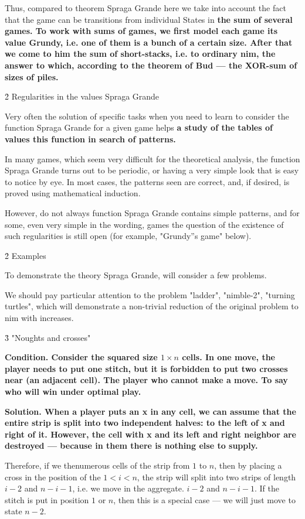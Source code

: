 Thus, compared to theorem Spraga Grande here we take into account the fact that the game can be transitions from individual States in \bf{the sum of several games}. To work with sums of games, we first model each game its value Grundy, i.e. one of them is a bunch of a certain size. After that we come to him the sum of short-stacks, i.e. to ordinary nim, the answer to which, according to the theorem of Bud --- the XOR-sum of sizes of piles.


\h2{ Regularities in the values Spraga Grande }

Very often the solution of specific tasks when you need to learn to consider the function Spraga Grande for a given game helps \bf{a study of the tables of values} this function in search of patterns.

In many games, which seem very difficult for the theoretical analysis, the function Spraga Grande turns out to be periodic, or having a very simple look that is easy to notice by eye. In most cases, the patterns seen are correct, and, if desired, is proved using mathematical induction.

However, do not always function Spraga Grande contains simple patterns, and for some, even very simple in the wording, games the question of the existence of such regularities is still open (for example, "Grundy''s game" below).


\h2{ Examples }

To demonstrate the theory Spraga Grande, will consider a few problems.

We should pay particular attention to the problem "ladder", "nimble-2", "turning turtles", which will demonstrate a non-trivial reduction of the original problem to nim with increases.


\h3{ "Noughts and crosses" }

\bf{Condition}. Consider the squared size $1 \times n$ cells. In one move, the player needs to put one stitch, but it is forbidden to put two crosses near (an adjacent cell). The player who cannot make a move. To say who will win under optimal play.

\bf{Solution}. When a player puts an x in any cell, we can assume that the entire strip is split into two independent halves: to the left of x and right of it. However, the cell with x and its left and right neighbor are destroyed --- because in them there is nothing else to supply.

Therefore, if we thenumerous cells of the strip from $1$ to $n$, then by placing a cross in the position of the $1 < i < n$, the strip will split into two strips of length $i-2$ and $n-i-1$, i.e. we move in the aggregate. $i-2$ and $n-i-1$. If the stitch is put in position $1$ or $n$, then this is a special case --- we will just move to state $n-2$.


